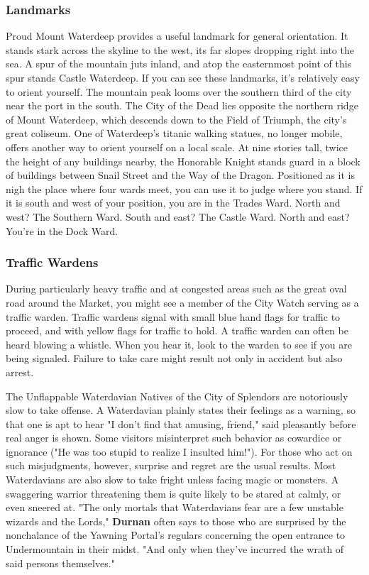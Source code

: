 \documentclass[10pt,a4paper,twoside,twocolumn,openany,nodeprecatedcode]{dndbook}
\begin{document}
\subsubsection{Landmarks}
Proud Mount Waterdeep provides a useful landmark for general orientation. It stands stark across the skyline to the west, its far slopes dropping right into the sea. A spur of the mountain juts inland, and atop the easternmost point of this spur stands Castle Waterdeep. If you can see these landmarks, it's relatively easy to orient yourself. The mountain peak looms over the southern third of the city near the port in the south. The City of the Dead lies opposite the northern ridge of Mount Waterdeep, which descends down to the Field of Triumph, the city's great coliseum.
One of Waterdeep's titanic walking statues, no longer mobile, offers another way to orient yourself on a local scale. At nine stories tall, twice the height of any buildings nearby, the Honorable Knight stands guard in a block of buildings between Snail Street and the Way of the Dragon. Positioned as it is nigh the place where four wards meet, you can use it to judge where you stand. If it is south and west of your position, you are in the Trades Ward. North and west? The Southern Ward. South and east? The Castle Ward. North and east? You're in the Dock Ward.
\subsubsection{Traffic Wardens}
During particularly heavy traffic and at congested areas such as the great oval road around the Market, you might see a member of the City Watch serving as a traffic warden. Traffic wardens signal with small blue hand flags for traffic to proceed, and with yellow flags for traffic to hold. A traffic warden can often be heard blowing a whistle. When you hear it, look to the warden to see if you are being signaled. Failure to take care might result not only in accident but also arrest.
\begin{DndComment}{The Unflappable Waterdavian}
Natives of the City of Splendors are notoriously slow to take offense. A Waterdavian plainly states their feelings as a warning, so that one is apt to hear "I don't find that amusing, friend," said pleasantly before real anger is shown. Some visitors misinterpret such behavior as cowardice or ignorance ("He was too stupid to realize I insulted him!"). For those who act on such misjudgments, however, surprise and regret are the usual results.
Most Waterdavians are also slow to take fright unless facing magic or monsters. A swaggering warrior threatening them is quite likely to be stared at calmly, or even sneered at. "The only mortals that Waterdavians fear are a few unstable wizards and the Lords," \textbf{Durnan} often says to those who are surprised by the nonchalance of the Yawning Portal's regulars concerning the open entrance to Undermountain in their midst. "And only when they've incurred the wrath of said persons themselves."
\end{DndComment}
\end{document}
